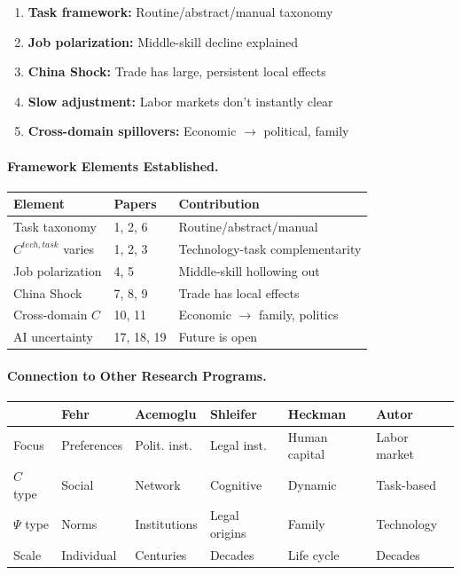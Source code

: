 \begin{enumerate}
  \item \textbf{Task framework:} Routine/abstract/manual taxonomy
  \item \textbf{Job polarization:} Middle-skill decline explained
  \item \textbf{China Shock:} Trade has large, persistent local effects
  \item \textbf{Slow adjustment:} Labor markets don't instantly clear
  \item \textbf{Cross-domain spillovers:} Economic $\to$ political, family
\end{enumerate}

\paragraph{Framework Elements Established.}

\begin{center}
\renewcommand{\arraystretch}{1.2}
\small
\begin{tabular}{lll}
\hline
\textbf{Element} & \textbf{Papers} & \textbf{Contribution} \\
\hline
Task taxonomy & 1, 2, 6 & Routine/abstract/manual \\
$C^{tech,task}$ varies & 1, 2, 3 & Technology-task complementarity \\
Job polarization & 4, 5 & Middle-skill hollowing out \\
China Shock & 7, 8, 9 & Trade has local effects \\
Cross-domain $C$ & 10, 11 & Economic $\to$ family, politics \\
AI uncertainty & 17, 18, 19 & Future is open \\
\hline
\end{tabular}
\end{center}

\paragraph{Connection to Other Research Programs.}

\begin{center}
\renewcommand{\arraystretch}{1.2}
\begin{tabular}{llllll}
\hline
& \textbf{Fehr} & \textbf{Acemoglu} & \textbf{Shleifer} & \textbf{Heckman} & \textbf{Autor} \\
\hline
Focus & Preferences & Polit. inst. & Legal inst. & Human capital & Labor market \\
$C$ type & Social & Network & Cognitive & Dynamic & Task-based \\
$\Psi$ type & Norms & Institutions & Legal origins & Family & Technology \\
Scale & Individual & Centuries & Decades & Life cycle & Decades \\
\hline
\end{tabular}
\end{center}

